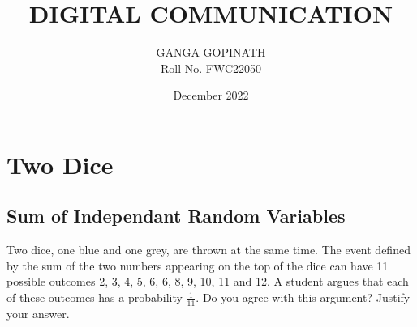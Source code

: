 \documentclass[12pt]{book}
\begin{document}
\large\title{DIGITAL COMMUNICATION}
\author{GANGA GOPINATH\\
Roll No. FWC22050\\}
\date{December 2022}
\normalsize
\maketitle

\tableofcontents

\bigskip

\setcounter{page}{1}

\chapter{Two Dice}
\section{Sum of Independant Random Variables}
Two dice, one blue and one grey, are thrown at the same time.   The event defined by the sum of the two numbers appearing on the top of the dice can have 11 possible outcomes 2, 3, 4, 5, 6, 6, 8, 9, 10, 11 and 12.  A student argues that each of these outcomes has a probability $\frac{1}{11}$.  Do you agree with this argument?  Justify your answer.
\end{document}

